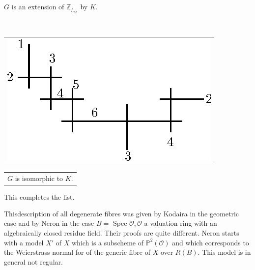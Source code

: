 \begin{case*}[$(C ~7)$ ]~ 

\begin{minipage}{5cm}
  \begin{figure}[H]
  \end{figure}
\end{minipage}\qquad 
\begin{minipage}{4.3cm}
  $G $ is an extension of $ \mathbb {Z}_{/_{2 \mathbb {Z}}}$ by $K$.
\end{minipage}
\end{case*}

\eject

\begin{case*}[$(C ~8)$ ]~
\smallskip

\noindent
\begin{tabular}{l}
{\includegraphics{vol37-figures/fig37-10.eps}}
\end{tabular}
\begin{tabular}[m]{l}
$G$ is isomorphic to $K$.
\end{tabular}


  This completes the list.	
\end{case*}

This\pageoriginale description of all degenerate fibres was given by
Kodaira in the 
geometric case and by Neron in the case $B=$ Spec $\mathscr O ,
\mathscr O$ a valuation ring with an algebraically  closed residue
field. Their proofs are quite different. Neron starts with  a model
$X'$ of $X$ which is a subscheme of $ \mathbb {P}^2 (\mathscr O)$ and
which corresponds to the Weierstrass normal for of the generic fibre
of $X$ over $R(B)$. This model is in general not regular.  

